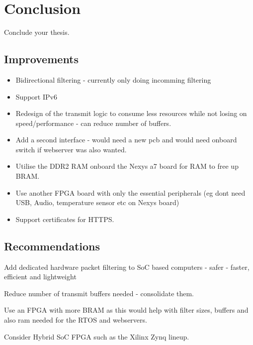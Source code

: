 \chapter[Conclusion]{Conclusion}
\label{Chap:Conclusion}

Conclude your thesis.




\section{Improvements}

\begin{itemize}
    \item Bidirectional filtering - currently only doing incomming filtering
    \item Support IPv6
    \item Redesign of the transmit logic to consume less resources while not losing on speed/performance - can reduce number of buffers. 
    \item Add a second interface - would need a new pcb and would need onboard switch if webserver was also wanted.
    \item Utilise the DDR2 RAM onboard the Nexys a7 board for RAM to free up BRAM. 
    \item Use another FPGA board with only the essential peripherals (eg dont need USB, Audio, temperature sensor etc on Nexys board)
    \item Support certificates for HTTPS. 
\end{itemize}


\section{Recommendations}

Add dedicated hardware packet filtering to SoC based computers - safer - faster, efficient and lightweight

Reduce number of transmit buffers needed - consolidate them.

Use an FPGA with more BRAM as this would help with filter sizes, buffers and also ram needed for the RTOS and webservers.

Consider Hybrid SoC FPGA such as the Xilinx Zynq lineup.

